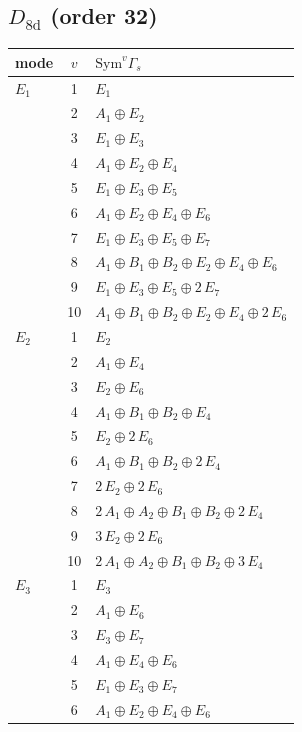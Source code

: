 \documentclass[11pt]{article}
\begin{document}
\subsection*{$D_{8\mathrm{d}}$ \quad (order 32)}
\begin{longtable}{l c p{}}
\hline mode & $v$ & $\mathrm{Sym}^v\Gamma_s$\\ \hline\endhead
$E_{1}$ & 1 & $E_{1}$\\
 & 2 & $A_{1}\oplus E_{2}$\\
 & 3 & $E_{1}\oplus E_{3}$\\
 & 4 & $A_{1}\oplus E_{2}\oplus E_{4}$\\
 & 5 & $E_{1}\oplus E_{3}\oplus E_{5}$\\
 & 6 & $A_{1}\oplus E_{2}\oplus E_{4}\oplus E_{6}$\\
 & 7 & $E_{1}\oplus E_{3}\oplus E_{5}\oplus E_{7}$\\
 & 8 & $A_{1}\oplus B_{1}\oplus B_{2}\oplus E_{2}\oplus E_{4}\oplus E_{6}$\\
 & 9 & $E_{1}\oplus E_{3}\oplus E_{5}\oplus 2\,E_{7}$\\
 & 10 & $A_{1}\oplus B_{1}\oplus B_{2}\oplus E_{2}\oplus E_{4}\oplus 2\,E_{6}$\\
\hline
$E_{2}$ & 1 & $E_{2}$\\
 & 2 & $A_{1}\oplus E_{4}$\\
 & 3 & $E_{2}\oplus E_{6}$\\
 & 4 & $A_{1}\oplus B_{1}\oplus B_{2}\oplus E_{4}$\\
 & 5 & $E_{2}\oplus 2\,E_{6}$\\
 & 6 & $A_{1}\oplus B_{1}\oplus B_{2}\oplus 2\,E_{4}$\\
 & 7 & $2\,E_{2}\oplus 2\,E_{6}$\\
 & 8 & $2\,A_{1}\oplus A_{2}\oplus B_{1}\oplus B_{2}\oplus 2\,E_{4}$\\
 & 9 & $3\,E_{2}\oplus 2\,E_{6}$\\
 & 10 & $2\,A_{1}\oplus A_{2}\oplus B_{1}\oplus B_{2}\oplus 3\,E_{4}$\\
\hline
$E_{3}$ & 1 & $E_{3}$\\
 & 2 & $A_{1}\oplus E_{6}$\\
 & 3 & $E_{3}\oplus E_{7}$\\
 & 4 & $A_{1}\oplus E_{4}\oplus E_{6}$\\
 & 5 & $E_{1}\oplus E_{3}\oplus E_{7}$\\
 & 6 & $A_{1}\oplus E_{2}\oplus E_{4}\oplus E_{6}$\\

\end{longtable}
\end{document}

